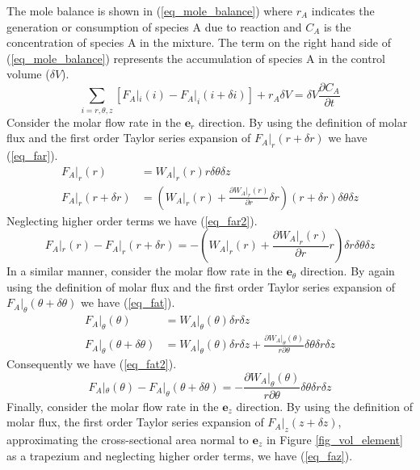 \documentclass[11pt,fleqn]{article}
\theoremstyle{defstyle}
\begin{document}
The mole balance is shown in (\ref{eq_mole_balance}) where $r_A$ indicates the generation or consumption of species A due to reaction and $C_A$ is the concentration of species A in the mixture. The term on the right hand side of (\ref{eq_mole_balance}) represents the accumulation of species A in the control volume ($\delta V$).
\begin{equation}
\sum_{i=r, \theta, z}[F_A|_i(i) - F_A|_i(i+\delta i)] + r_A \delta V = \delta V \frac{\partial C_A}{\partial t}
\label{eq_mole_balance}
\end{equation}
Consider the molar flow rate in the $\mathbf{e}_r$ direction. By using the definition of molar flux and the first order Taylor series expansion of $F_A|_r(r+\delta r)$ we have (\ref{eq_far}).
\begin{equation}
\begin{aligned}
F_A|_r(r) &= W_A|_r(r) r \delta \theta \delta z \\
F_A|_r(r+\delta r) &= (W_ A|_r(r) + \frac{\partial W_A|_r(r)}{\partial r} \delta r)(r+\delta r)\delta \theta \delta z
\end{aligned}
\label{eq_far}
\end{equation}
Neglecting higher order terms we have (\ref{eq_far2}).  
\begin{equation}
F_A|_r(r) - F_A|_r(r+\delta r)  = - (W_ A|_r(r)  + \frac{\partial W_A|_r(r)}{\partial r}r) \delta r \delta \theta \delta z
\label{eq_far2}
\end{equation}
In a similar manner, consider the molar flow rate in the $\mathbf{e}_\theta$ direction. By again using the definition of molar flux and the first order Taylor series expansion of $F_A|_\theta(\theta+\delta \theta)$ we have (\ref{eq_fat}).
\begin{equation}
\begin{aligned}
F_A|_\theta(\theta) &= W_A|_\theta(\theta) \delta r \delta z \\
F_A|_\theta(\theta + \delta \theta) &= W_A|_\theta(\theta) \delta r \delta z + \frac{\partial W_A|_\theta(\theta)}{r \partial \theta}\delta \theta\delta r \delta z
\end{aligned}
\label{eq_fat}
\end{equation}
Consequently we have (\ref{eq_fat2}).
\begin{equation}
F_A|_\theta(\theta) - F_A|_\theta(\theta + \delta \theta) =- \frac{\partial W_A|_\theta(\theta)}{r \partial \theta}\delta \theta\delta r \delta z
\label{eq_fat2} 
\end{equation}
Finally, consider the molar flow rate in the $\mathbf{e}_z$ direction. By using the definition of molar flux, the first order Taylor series expansion of $F_A|_z(z+\delta z)$, approximating the cross-sectional area normal to $\mathbf{e}_z$ in Figure \ref{fig_vol_element} as a trapezium and neglecting higher order terms, we have (\ref{eq_faz}).
\end{document}
